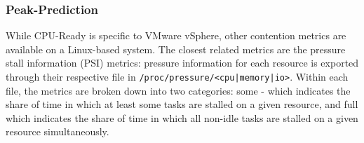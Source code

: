 %
%
%

\subsubsection{Peak-Prediction}
While CPU-Ready is specific to VMware vSphere, other contention metrics
are available on a Linux-based system. The closest related metrics are the
pressure stall information (PSI) metrics: pressure information for each resource
is exported through their respective file in
\verb$/proc/pressure/<cpu|memory|io>$. Within each file, the metrics are
broken down into two categories: some - which indicates the share of time in
which at least some tasks are stalled on a given resource, and full which
indicates the share of time in which all non-idle tasks are stalled on a given
resource simultaneously.

